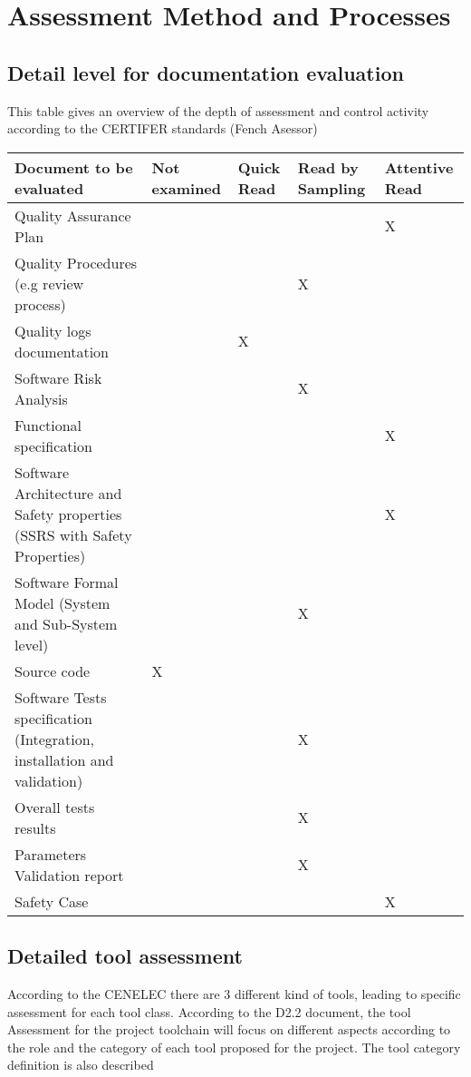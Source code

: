 \documentclass{template/openetcs_article}
\begin{document}
\section{Assessment Method and Processes}

\subsection{Detail level for documentation evaluation}

This table gives an overview of the depth of assessment and control activity according to the CERTIFER standards (Fench Asessor)

\begin{tabular}{|p{5cm}|p{2cm}|p{2cm}|p{2cm}|p{2cm}|} 
\hline
\textbf{Document to be evaluated} & \textbf{Not examined} & \textbf{Quick Read} & \textbf{Read by Sampling} & \textbf{Attentive Read} \\ \hline
Quality Assurance Plan & & & & X \\ \hline
Quality Procedures (e.g review process) & & & X & \\ \hline
Quality logs documentation & & X & & \\ \hline
Software Risk Analysis & & & X & \\ \hline
Functional specification & & & & X \\ \hline
Software Architecture and Safety properties (SSRS with Safety Properties) & & & & X \\ \hline
Software Formal Model (System and Sub-System level) & & & X & \\ \hline
Source code & X & & & \\ \hline
Software Tests specification (Integration, installation and validation) & & & X & \\ \hline
Overall tests results & & & X & \\ \hline
Parameters Validation report & & & X & \\ \hline
Safety Case & & & & X \\ \hline
\end{tabular}

\subsection{Detailed tool assessment}
According to the CENELEC there are 3 different kind of tools, leading to specific assessment for each tool class. According to the D2.2 document, the tool Assessment for the project toolchain will focus on different aspects according to the role and the category of each tool proposed for the project. The tool category definition is also described 
\end{document}
